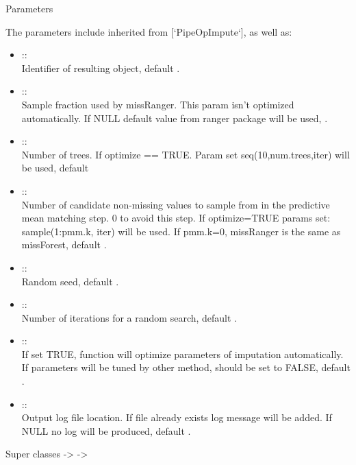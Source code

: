 \documentclass[letterpaper]{book}
\begin{document}
\begin{Section}{Parameters}

The parameters include inherited from [`PipeOpImpute`], as well as: \\{}
\begin{itemize}

\item{}  :: \\{}
Identifier of resulting object, default .
\item{}  :: \\{}
Sample fraction used by missRanger. This param isn't optimized automatically. If NULL default value from ranger package will be used, .
\item{}  :: \\{}
Number of trees. If optimize == TRUE. Param set seq(10,num.trees,iter) will be used, default 
\item{}  :: \\{}
Number of candidate non-missing values to sample from in the predictive mean matching step. 0 to avoid this step. If optimize=TRUE params set: sample(1:pmm.k, iter) will be used. If pmm.k=0, missRanger is the same as missForest, default .
\item{}  :: \\{}
Random seed, default .
\item{}  :: \\{}
Number of iterations for a random search, default .
\item{}  :: \\{}
If set TRUE, function will optimize parameters of imputation automatically. If parameters will be tuned by other method, should be set to FALSE, default .
\item{}  :: \\{}
Output log file location. If file already exists log message will be added. If NULL no log will be produced, default .

\end{itemize}

\end{Section}
%
\begin{Section}{Super classes}
 ->  -> 
\end{Section}
\end{document}
